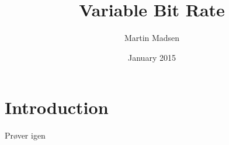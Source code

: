 \documentclass{article}
\title{Variable Bit Rate}
\author{Martin Madsen}
\date{January 2015}
\begin{document}
\maketitle

\section{Introduction}
Prøver igen
\end{document}
